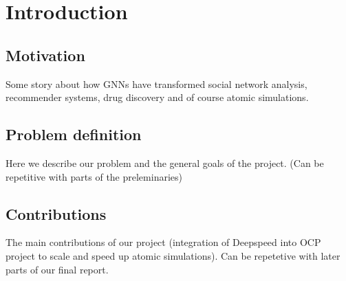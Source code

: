 \section{Introduction}

\subsection{Motivation}

Some story about how GNNs have transformed social network analysis, recommender systems, drug discovery and of course atomic simulations.

\subsection{Problem definition}

Here we describe our problem and the general goals of the project. (Can be repetitive with parts of the preleminaries)

\subsection{Contributions}

The main contributions of our project (integration of Deepspeed into OCP project to scale and speed up atomic simulations). 
Can be repetetive with later parts of our final report.